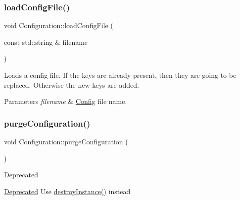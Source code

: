 \subsubsection{\texorpdfstring{load\+Config\+File()}{loadConfigFile()}\hspace{0.1cm}{\footnotesize\ttfamily [2/2]}}
{\footnotesize\ttfamily void Configuration\+::load\+Config\+File (\begin{DoxyParamCaption}\item[{const std\+::string \&}]{filename }\end{DoxyParamCaption})}

Loads a config file. If the keys are already present, then they are going to be replaced. Otherwise the new keys are added.


\begin{DoxyParams}{Parameters}
{\em filename} & \hyperlink{classConfig}{Config} file name. \\
\hline
\end{DoxyParams}
\mbox{\label{classConfiguration_abf8266180bf01733dc5e4b5fb0006c78}} 
\subsubsection{\texorpdfstring{purge\+Configuration()}{purgeConfiguration()}\hspace{0.1cm}{\footnotesize\ttfamily [1/2]}}
{\footnotesize\ttfamily void Configuration\+::purge\+Configuration (\begin{DoxyParamCaption}{ }\end{DoxyParamCaption})\hspace{0.3cm}{\ttfamily [static]}}

\begin{DoxyRefDesc}{Deprecated}
\item[\hyperlink{deprecated__deprecated000050}{Deprecated}]Use \hyperlink{classConfiguration_acbc9e73d16e5eb122e7daef71c955cf2}{destroy\+Instance()} instead \end{DoxyRefDesc}
\mbox{\label{classConfiguration_a65a257355e83f9b2ad136d2de3f654ee}} 
